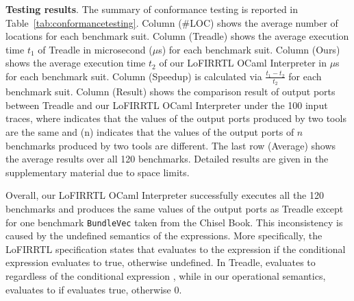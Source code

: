 \smallskip\noindent
{\bf Testing results}.
The summary of conformance testing is reported in Table~\ref{tab:conformancetesting}.
Column (\#LOC) shows the average number of locations for each benchmark suit.
Column (Treadle) shows the average execution time $t_1$ of Treadle in microsecond ($\mu$s) for each benchmark suit.
Column (Ours) shows the average execution time $t_2$ of our LoFIRRTL OCaml Interpreter in $\mu$s for each benchmark suit.
Column (Speedup) is calculated via $\frac{t_1-t_2}{t_2}$ for each benchmark suit.
Column (Result) shows the comparison result of output ports between Treadle and our LoFIRRTL OCaml Interpreter under the 100 input traces,
where  indicates that the values of the output ports produced by two tools are the same and (n) indicates
that the values of the output ports of $n$ benchmarks produced by two tools are different.
The last row (Average) shows the average results over all 120 benchmarks.
Detailed results are given in the supplementary material due to space limits.

Overall, our LoFIRRTL OCaml Interpreter successfully executes all the 120 benchmarks
and produces the same values of the output ports as Treadle except for one benchmark \texttt{BundleVec} taken from the Chisel Book.
This inconsistency is caused by the undefined semantics of the  expressions.
More specifically, the LoFIRRTL specification states that  evaluates to the expression 
if the conditional expression  evaluates to true, otherwise undefined.
In Treadle,   evaluates to 
 regardless of the conditional expression , while
 in our operational semantics,  evaluates to 
if  evaluates true, otherwise $0$.


